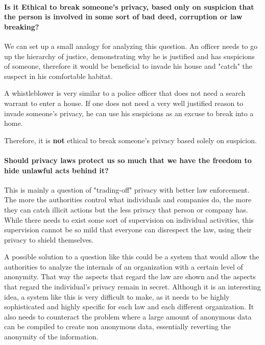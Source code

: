    

    \paragraph{Is it Ethical to break someone's privacy, based only on suspicion that the person is involved in some sort of bad deed, corruption or law breaking?}
    We can set up a small analogy for analyzing this question.
    An officer needs to go up the hierarchy of justice, demonstrating why he is justified and has suspicions of someone, therefore it would be beneficial to invade his house and "catch" the suspect in his comfortable habitat.
    
    A whistleblower is very similar to a police officer that does not need a search warrant to enter a house.
    If one does not need a very well justified reason to invade someone's privacy, he can use his suspicions as an excuse to break into a home.
    
    Therefore, it is \textbf{not} ethical to break someone's privacy based solely on suspicion.

    \paragraph{Should privacy laws protect us so much that we have the freedom to hide unlawful acts behind it?}
    This is mainly a question of "trading-off" privacy with better law enforcement.
    The more the authorities control what individuals and companies do, the more they can catch illicit actions but the less privacy that person or company has.
    While there needs to exist some sort of supervision on individual activities, this supervision cannot be so mild that everyone can disrespect the law, using their privacy to shield themselves.

    A possible solution to a question like this could be a system that would allow the authorities to analyze the internals of an organization with a certain level of anonymity.
    That way the aspects that regard the law are shown and the aspects that regard the individual's privacy remain in secret.
    Although it is an interesting idea, a system like this is very difficult to make, as it needs to be highly sophisticated and highly specific for each law and each different organization.
    It also needs to counteract the problem where a large amount of anonymous data can be compiled to create non anonymous data, essentially reverting the anonymity of the information.
    

